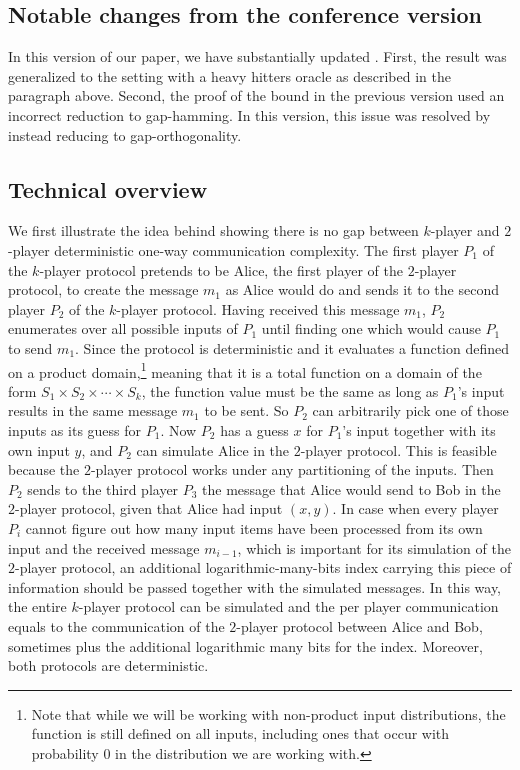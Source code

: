 \documentclass{toc}
\begin{document}
%
\subsection{Notable changes from the conference version}
In this version of our paper, we have substantially updated . %
First,  %
the result was generalized to the setting with a heavy hitters oracle as described in the paragraph above. %
Second,  %
the proof of the bound in the previous version used an incorrect reduction to gap-hamming. In this version, this issue was resolved by instead reducing to gap-orthogonality.

\subsection{Technical overview}
We first illustrate the 
idea behind showing there is no gap between $k$-player and $2$-player
deterministic one-way communication complexity. The first player $P_1$
of the $k$-player protocol pretends to be Alice, the first player of the $2$-player protocol, 
to create the message $m_1$ as Alice would do
and sends it to the second player $P_2$ of the $k$-player protocol. 
Having received this message $m_1$,
$P_2$  enumerates over all possible
inputs of $P_1$ until finding one
which would cause $P_1$ to send $m_1$. 
Since the protocol is deterministic and it evaluates a function defined on a product domain,\footnote{{\color{black} Note that while we will be working with non-product input distributions, the function is still defined on all inputs, including ones that occur with probability 0 in the distribution we are working with.}} meaning that it is a total function on a domain of the form $S_1 \times S_2 \times \cdots \times S_k$, 
the function value must be the same as long as $P_1$'s input results in the same message $m_1$ to be sent.
So $P_2$ can arbitrarily pick one of those inputs as its guess for $P_1$.
Now $P_2$ has a guess $x$ for $P_1$'s input together
with its own input $y$, and $P_2$ can simulate Alice in the $2$-player protocol. 
This is feasible because the $2$-player protocol works under any partitioning of the inputs. 
Then $P_2$ sends to the third player $P_3$ the message that Alice would send to Bob in the $2$-player protocol, 
given that Alice had input $(x,y)$.
In case when every player $P_i$ cannot figure out how many input items have been processed from its own input and the received message $m_{i-1}$, which is important for its simulation of the $2$-player protocol,
an additional logarithmic-many-bits index carrying this piece of information should be passed together with the simulated messages.
In this way, the entire $k$-player protocol can be simulated
and the per player communication equals to the communication of the $2$-player protocol between Alice and Bob, sometimes plus the additional logarithmic many bits for the index. 
Moreover, both protocols are deterministic. 
\end{document}
